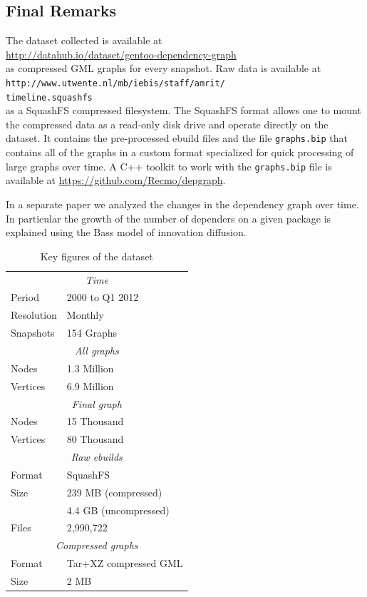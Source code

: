 \documentclass[smallextended,final]{svjour3}
\begin{document}
\subsection{Final Remarks}

The dataset collected is available at
\\\url{http://datahub.io/dataset/gentoo-dependency-graph}\\
as compressed GML graphs for every snapshot. Raw data is available at
\\\texttt{http://www.utwente.nl/mb/iebis/staff/amrit/}\\\texttt{timeline.squashfs}\\
as a SquashFS compressed filesystem. The SquashFS format allows one to mount the compressed data as a read-only disk drive and operate directly on the dataset. It contains the pre-processed ebuild files and the file \verb|graphs.bip| that contains all of the graphs in a custom format specialized for quick processing of large graphs over time. A C++ toolkit to work with the \verb|graphs.bip| file is available at \url{https://github.com/Recmo/depgraph}.

In a separate paper \citep{rem142} we analyzed the changes in the dependency graph over time. In particular the growth of the number of dependers on a given package is explained using the Bass model of innovation diffusion.

\begin{table}
\centering
\caption{Key figures of the dataset}\label{tbl:dataset}
\begin{tabular}{ll}
\toprule
\multicolumn{2}{c}{\emph{Time}} \\[0.5mm]
Period & 2000 to Q1 2012 \\
Resolution & Monthly \\
Snapshots & 154 Graphs \\
\midrule
\multicolumn{2}{c}{\emph{All graphs}} \\[0.5mm]
Nodes & 1.3 Million \\
Vertices & 6.9 Million \\
\midrule
\multicolumn{2}{c}{\emph{Final graph}} \\[0.5mm]
Nodes & 15 Thousand \\
Vertices & 80 Thousand \\
\midrule
\multicolumn{2}{c}{\emph{Raw ebuilds}} \\[0.5mm]
Format & SquashFS \\
Size & 239 MB (compressed) \\
 & 4.4 GB (uncompressed) \\
Files & 2,990,722 \\
\midrule
\multicolumn{2}{c}{\emph{Compressed graphs}} \\[0.5mm]
Format & Tar+XZ compressed GML \\
Size & 2 MB \\
\bottomrule
\end{tabular}
\end{table}
\end{document}
